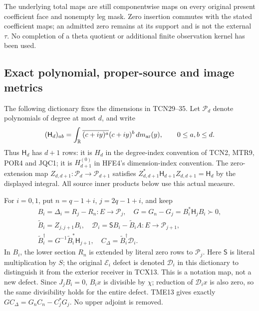 \documentclass[11pt,a4paper]{article}
\begin{document}
The underlying total maps are still componentwise maps on every
original present coefficient face and nonempty leg mask. Zero insertion
commutes with the stated coefficient maps; an admitted zero remains at
its support and is not the external $\tau$. No completion of a theta
quotient or additional finite observation kernel has been used.

\subsection{Exact polynomial, proper-source and image metrics}
\label{sec:tcn:dictionary}

The following dictionary fixes the dimensions in TCN29--35. Let
$\mathcal P_d$ denote polynomials of degree at most $d$, and write
\[
 (\mathsf H_d)_{ab}=\int_{\mathbb R}
       \overline{(c+iy)^a}(c+iy)^b\,dm_{\rm ar}(y),
       \qquad 0\le a,b\le d.
\]
Thus $\mathsf H_d$ has $d+1$ rows: it is $H_d$ in the
degree-index convention of TCN2, MTR9, POR4 and JQC1; it is
$H_{d+1}^{(0)}$ in HFE4's dimension-index convention. The zero-extension map
$Z_{d,d+1}:\mathcal P_d\to\mathcal P_{d+1}$ satisfies
$Z_{d,d+1}^*\mathsf H_{d+1}Z_{d,d+1}=\mathsf H_d$ by the displayed
integral. All source inner products below use this actual measure.

For $i=0,1$, put $n=q-1+i$, $j=2q-1+i$, and keep
\begin{equation}\tag{TCD1}
\begin{gathered}
 B_i=\Delta_i=R_j-R_n:E\longrightarrow\mathcal P_j,
 \quad G=G_n-G_j=B_i^*\mathsf H_jB_i\succ0,\\
 \widetilde B_i=Z_{j,j+1}B_i,
 \quad\mathcal D_i=\mathsf SB_i-\widetilde B_iA:
                     E\longrightarrow\mathcal P_{j+1},\\
 \widetilde B_i^\dagger=G^{-1}\widetilde B_i^*\mathsf H_{j+1},
 \quad C_\Delta=\widetilde B_i^\dagger\mathcal D_i.
\end{gathered}
\end{equation}
In $B_i$, the lower section $R_n$ is extended by literal zero rows
to $\mathcal P_j$. Here $\mathsf S$ is literal multiplication by $S$; the original
$\mathcal E_i$ defect is denoted $\mathcal D_i$ in this dictionary
to distinguish it from the exterior receiver in TCX13. This is a
notation map, not a new defect. Since $J_jB_i=0$, $B_ix$ is divisible
by $\chi$; reduction of $\mathcal D_ix$ is also zero, so the same
divisibility holds for the entire defect. TME13 gives exactly
$GC_\Delta=G_nC_n-C_j^*G_j$. No upper adjoint is removed.
\end{document}

